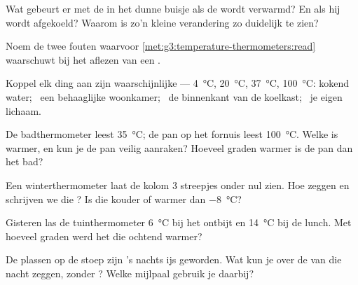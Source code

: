 \begin{exercise}[$\star$]\label{exo:g3:temperature-thermometers:3}
Wat gebeurt er met de  in het dunne buisje als de
 wordt verwarmd? En als hij wordt afgekoeld? Waarom is
zo'n kleine verandering zo duidelijk te zien?
\end{exercise}

\begin{exercise}[$\star$]\label{exo:g3:temperature-thermometers:4}
Noem de twee fouten waarvoor
\cref{met:g3:temperature-thermometers:read} waarschuwt bij het aflezen
van een .
\end{exercise}

\begin{exercise}[$\star$]\label{exo:g3:temperature-thermometers:5}
Koppel elk ding aan zijn waarschijnlijke  ---
\qty{4}{\celsius}, \qty{20}{\celsius}, \qty{37}{\celsius},
\qty{100}{\celsius}: kokend water; \ een behaaglijke woonkamer; \ de
binnenkant van de koelkast; \ je eigen lichaam.
\end{exercise}

\begin{exercise}[$\star$]\label{exo:g3:temperature-thermometers:6}
De badthermometer leest \qty{35}{\celsius}; de pan op het fornuis
leest \qty{100}{\celsius}. Welke is warmer, en kun je de pan veilig
aanraken? Hoeveel graden warmer is de pan dan het bad?
\end{exercise}

\begin{exercise}[$\star$]\label{exo:g3:temperature-thermometers:7}
Een winterthermometer laat de kolom $3$ streepjes onder nul zien. Hoe
zeggen en schrijven we die ? Is die kouder of warmer dan
\qty{-8}{\celsius}?
\end{exercise}

\begin{exercise}[$\star$]\label{exo:g3:temperature-thermometers:8}
Gisteren las de tuinthermometer \qty{6}{\celsius} bij het ontbijt en
\qty{14}{\celsius} bij de lunch. Met hoeveel graden werd het die
ochtend warmer?
\end{exercise}

\begin{exercise}[$\star$]\label{exo:g3:temperature-thermometers:9}
De plassen op de stoep zijn 's nachts ijs geworden. Wat kun je over de
 van die nacht zeggen, zonder ? Welke mijlpaal
gebruik je daarbij?
\end{exercise}

